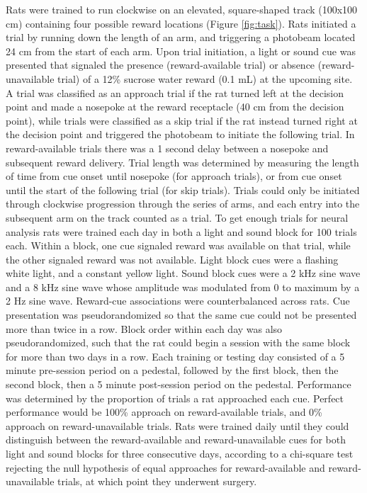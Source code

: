 \documentclass[11pt]{article}
\begin{document}
Rats were trained to run clockwise on an elevated, square-shaped track (100x100 cm) containing four possible reward locations (Figure \ref{fig:task}). Rats initiated a trial by running down the length of an arm, and triggering a photobeam located 24 cm from the start of each arm. Upon trial initiation, a light or sound cue was presented that signaled the presence (reward-available trial) or absence (reward-unavailable trial) of a 12\% sucrose water reward (0.1 mL) at the upcoming site. A trial was classified as an approach trial if the rat turned left at the decision point and made a nosepoke at the reward receptacle (40 cm from the decision point), while trials were classified as a skip trial if the rat instead turned right at the decision point and triggered the photobeam to initiate the following trial. In reward-available trials there was a 1 second delay between a nosepoke and subsequent reward delivery. Trial length was determined by measuring the length of time from cue onset until nosepoke (for approach trials), or from cue onset until the start of the following trial (for skip trials). Trials could only be initiated through clockwise progression through the series of arms, and each entry into the subsequent arm on the track counted as a trial. To get enough trials for neural analysis rats were trained each day in both a light and sound block for 100 trials each. Within a block, one cue signaled reward was available on that trial, while the other signaled reward was not available. Light block cues were a flashing white light, and a constant yellow light. Sound block cues were a 2 kHz sine wave and a 8 kHz sine wave whose amplitude was modulated from 0 to maximum by a 2 Hz sine wave. Reward-cue associations were counterbalanced across rats. Cue presentation was pseudorandomized so that the same cue could not be presented more than twice in a row. Block order within each day was also pseudorandomized, such that the rat could begin a session with the same block for more than two days in a row. Each training or testing day consisted of a 5 minute pre-session period on a pedestal, followed by the first block, then the second block, then a 5 minute post-session period on the pedestal. Performance was determined by the proportion of trials a rat approached each cue. Perfect performance would be 100\% approach on reward-available trials, and 0\% approach on reward-unavailable trials. Rats were trained daily until they could distinguish between the reward-available and reward-unavailable cues for both light and sound blocks for three consecutive days, according to a chi-square test rejecting the null hypothesis of equal approaches for reward-available and reward-unavailable trials, at which point they underwent surgery. 
\end{document}

